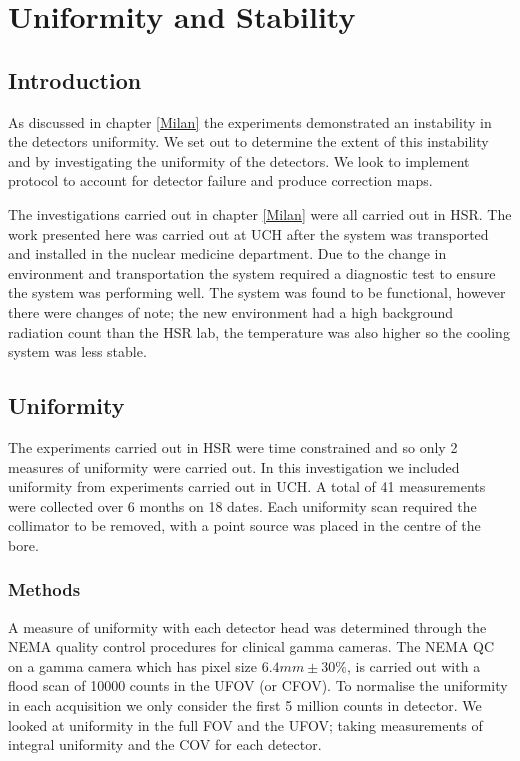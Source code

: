 \chapter{Uniformity and Stability}
\label{Linearity}

\section{Introduction}
As discussed in chapter \ref{Milan} the experiments demonstrated an instability in the detectors uniformity. We set out to determine the extent of this instability and by investigating the uniformity of the detectors. We look to implement protocol to account for detector failure and produce correction maps.

The investigations carried out in chapter \ref{Milan} were all carried out in \acrshort{HSR}. The work presented here was carried out at \acrlong{UCH} after the system was transported and installed in the nuclear medicine department. Due to the change in environment and transportation the system required a diagnostic test to ensure the system was performing well. The system was found to be functional, however there were changes of note; the new environment had a high background radiation count than the \acrshort{HSR} lab, the temperature was also higher so the cooling system was less stable. 

\section{Uniformity}
The experiments carried out in \acrshort{HSR} were time constrained and so only 2 measures of uniformity were carried out. In this investigation we included uniformity from experiments carried out in \acrshort{UCH}. A total of 41 measurements were collected over 6 months on 18 dates. Each uniformity scan required the collimator to be removed, with a point source was placed in the centre of the bore.  
\subsection{Methods}
A measure of uniformity with each detector head was determined through the NEMA quality control procedures for clinical gamma cameras. The \acrshort{NEMA} QC on a gamma camera which has pixel size $6.4 mm \pm 30\%$, is carried out with a flood scan of 10000 counts in the \acrlong{UFOV} (or \acrlong{CFOV}). To normalise the uniformity in each acquisition we only consider the first 5 million counts in detector. We looked at uniformity in the full \acrshort{FOV} and the \acrshort{UFOV}; taking measurements of integral uniformity and the \acrlong{COV} for each detector. 

